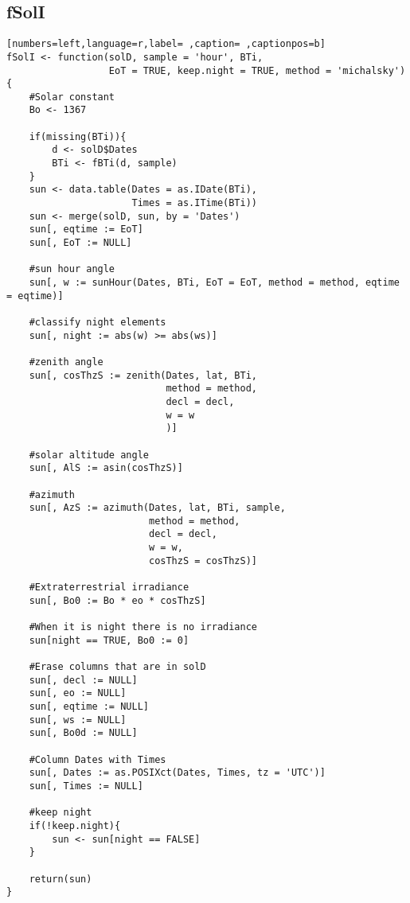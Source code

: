 \subsection{fSolI}
\label{sec:orga82594c}
\begin{lstlisting}[numbers=left,language=r,label= ,caption= ,captionpos=b]
fSolI <- function(solD, sample = 'hour', BTi,
                  EoT = TRUE, keep.night = TRUE, method = 'michalsky')
{
    #Solar constant
    Bo <- 1367

    if(missing(BTi)){
        d <- solD$Dates
        BTi <- fBTi(d, sample)
    }
    sun <- data.table(Dates = as.IDate(BTi),
                      Times = as.ITime(BTi))
    sun <- merge(solD, sun, by = 'Dates')
    sun[, eqtime := EoT]
    sun[, EoT := NULL]

    #sun hour angle
    sun[, w := sunHour(Dates, BTi, EoT = EoT, method = method, eqtime = eqtime)]

    #classify night elements
    sun[, night := abs(w) >= abs(ws)]

    #zenith angle
    sun[, cosThzS := zenith(Dates, lat, BTi,
                            method = method,
                            decl = decl,
                            w = w
                            )]

    #solar altitude angle
    sun[, AlS := asin(cosThzS)]

    #azimuth
    sun[, AzS := azimuth(Dates, lat, BTi, sample,
                         method = method,
                         decl = decl, 
                         w = w,
                         cosThzS = cosThzS)]

    #Extraterrestrial irradiance
    sun[, Bo0 := Bo * eo * cosThzS]

    #When it is night there is no irradiance
    sun[night == TRUE, Bo0 := 0]

    #Erase columns that are in solD
    sun[, decl := NULL]
    sun[, eo := NULL]
    sun[, eqtime := NULL]
    sun[, ws := NULL]
    sun[, Bo0d := NULL]

    #Column Dates with Times
    sun[, Dates := as.POSIXct(Dates, Times, tz = 'UTC')]
    sun[, Times := NULL]

    #keep night
    if(!keep.night){
        sun <- sun[night == FALSE]
    }

    return(sun)
}
\end{lstlisting}

